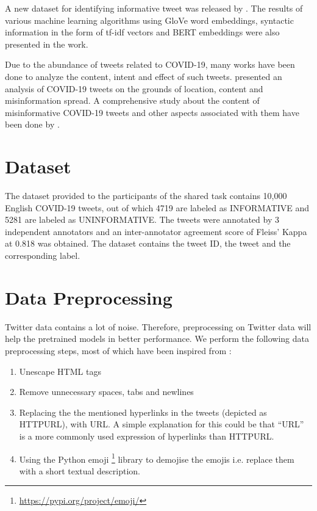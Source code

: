 \documentclass[11pt,a4paper]{article}
\begin{document}
A new dataset for identifying informative tweet was released by \citet{aggarwal2019classification}. The results of various machine learning algorithms using GloVe \citep{pennington2014glove} word embeddings, syntactic information in the form of tf-idf vectors and BERT embeddings were also presented in the work. 

Due to the abundance of tweets related to COVID-19, many works have been done to analyze the content, intent and effect of such tweets. \citet{singh2020first} presented an analysis of COVID-19 tweets on the grounds of location, content and misinformation spread. A comprehensive study about the content of misinformative COVID-19 tweets and other aspects associated with them  have been done by \citet{shahi2020exploratory}.





\section{Dataset}
\label{sec:data}

The dataset \citep{covid19tweet} provided to the participants of the shared task contains 10,000 English COVID-19 tweets, out of which 4719 are labeled as INFORMATIVE and 5281 are labeled as UNINFORMATIVE. The tweets were annotated by 3 independent annotators and an inter-annotator agreement score of Fleiss' Kappa at 0.818 was obtained. The dataset contains the tweet ID, the tweet and the corresponding label.




\section{Data Preprocessing}
\label{sec:process}

Twitter data contains a lot of noise. Therefore, preprocessing on Twitter data will help the pretrained models in better performance. We perform the following data preprocessing steps, most of which have been inspired from \citet{muller2020covid} :

\begin{enumerate}
\item Unescape HTML tags
\vspace{-0.2cm} \item Remove unnecessary spaces, tabs and newlines
\vspace{-0.2cm} \item Replacing the the mentioned hyperlinks in the tweets (depicted as HTTPURL), with URL. A simple explanation for this could be that “URL” is a more commonly used expression of hyperlinks than HTTPURL.

\vspace{-0.2cm} \item Using the Python emoji \footnote{\url{https://pypi.org/project/emoji/}} library to demojise the emojis i.e. replace them with a short textual description.
\end{enumerate}
\end{document}
